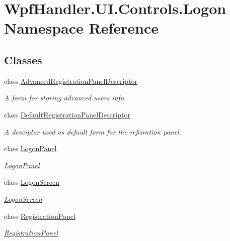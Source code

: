 \hypertarget{namespace_wpf_handler_1_1_u_i_1_1_controls_1_1_logon}{}\section{Wpf\+Handler.\+U\+I.\+Controls.\+Logon Namespace Reference}
\label{namespace_wpf_handler_1_1_u_i_1_1_controls_1_1_logon}
\subsection*{Classes}
\begin{DoxyCompactItemize}
\item 
class \mbox{\hyperlink{class_wpf_handler_1_1_u_i_1_1_controls_1_1_logon_1_1_advanced_registration_panel_descriptor}{Advanced\+Registration\+Panel\+Descriptor}}
\begin{DoxyCompactList}\small\item\em A form for storing advanced user\textquotesingle{}s info. \end{DoxyCompactList}\item 
class \mbox{\hyperlink{class_wpf_handler_1_1_u_i_1_1_controls_1_1_logon_1_1_default_registration_panel_descriptor}{Default\+Registration\+Panel\+Descriptor}}
\begin{DoxyCompactList}\small\item\em A desciptor used as default form for the refisration panel. \end{DoxyCompactList}\item 
class \mbox{\hyperlink{class_wpf_handler_1_1_u_i_1_1_controls_1_1_logon_1_1_logon_panel}{Logon\+Panel}}
\begin{DoxyCompactList}\small\item\em \mbox{\hyperlink{class_wpf_handler_1_1_u_i_1_1_controls_1_1_logon_1_1_logon_panel}{Logon\+Panel}} \end{DoxyCompactList}\item 
class \mbox{\hyperlink{class_wpf_handler_1_1_u_i_1_1_controls_1_1_logon_1_1_logon_screen}{Logon\+Screen}}
\begin{DoxyCompactList}\small\item\em \mbox{\hyperlink{class_wpf_handler_1_1_u_i_1_1_controls_1_1_logon_1_1_logon_screen}{Logon\+Screen}} \end{DoxyCompactList}\item 
class \mbox{\hyperlink{class_wpf_handler_1_1_u_i_1_1_controls_1_1_logon_1_1_registration_panel}{Registration\+Panel}}
\begin{DoxyCompactList}\small\item\em \mbox{\hyperlink{class_wpf_handler_1_1_u_i_1_1_controls_1_1_logon_1_1_registration_panel}{Registration\+Panel}} \end{DoxyCompactList}\end{DoxyCompactItemize}
